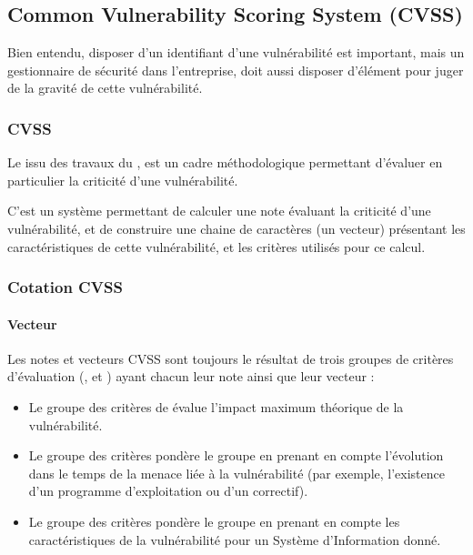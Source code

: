 \subsection{Common Vulnerability Scoring System (CVSS)}

Bien entendu, disposer d'un identifiant d'une vulnérabilité est important, mais  un gestionnaire de sécurité dans l'entreprise, doit aussi disposer d'élément pour juger de la gravité de cette vulnérabilité. 


\begin{frame}
\frametitle<presentation>{CVSS}
Le   issu des travaux du  , est un cadre méthodologique permettant d'évaluer en particulier la criticité d'une vulnérabilité.
\end{frame}


C'est un système permettant de calculer une note évaluant la criticité d'une vulnérabilité, et de construire une chaine de caractères (un vecteur) présentant les caractéristiques de cette vulnérabilité, et les critères utilisés pour ce calcul.

\begin{frame}
\frametitle<presentation>{Cotation CVSS}
\framesubtitle<presentation>{Vecteur}
Les notes et vecteurs CVSS sont toujours le résultat de trois groupes de critères d'évaluation (,  et ) ayant chacun leur note ainsi que leur vecteur :
\begin{itemize}
  \item Le groupe des critères de\textbf{ } évalue l'impact maximum théorique de la vulnérabilité.
  \item Le groupe des critères\textbf{   }pondère le groupe  en prenant en compte  l'évolution dans le temps de la menace liée à la vulnérabilité  (par exemple, l'existence d'un programme d’exploitation ou d'un correctif).
  \item Le groupe des critères\textbf{  }pondère le groupe  en prenant en compte les caractéristiques de la vulnérabilité pour un Système d'Information donné.
\end{itemize}
\end{frame}

